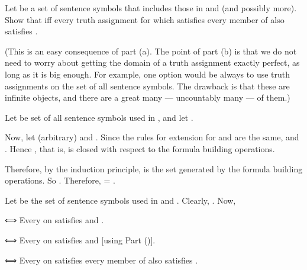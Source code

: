 			\item  Let  be a set of sentence symbols that includes those in  and  (and possibly more). Show that  iff every truth assignment for  which satisfies every member of  also satisfies .

				(This is an easy consequence of part (a). The point of part (b) is that we do not need to worry about getting the domain of a truth assignment exactly perfect, as long as it is big enough. For example, one option would be always to use truth assignments on the set of all sentence symbols. The drawback is that these are infinite objects, and there are a great many — uncountably many — of them.)
		\stopitemize
	\stopexercise
	\startsolution
		\startitemize[a]
			\item[uniqueness]  Let  be set of all sentence symbols used in , and let .

			Now, let  (arbitrary) and . Since the rules for extension for  and  are the same,  and . Hence , that is,  is closed with respect to the formula building operations.

			Therefore, by the induction principle,  is the set generated by the formula building operations. So . Therefore,  = .

			\item  Let  be the set of sentence symbols used in  and . Clearly, . Now, 

				⟺  Every  on  satisfies  and .

				⟺  Every  on  satisfies  and  [using Part (\in[uniqueness])].
				
				⟺  Every  on  satisfies every member of  also satisfies .
		\stopitemize
	\stopsolution

\stopexercises

